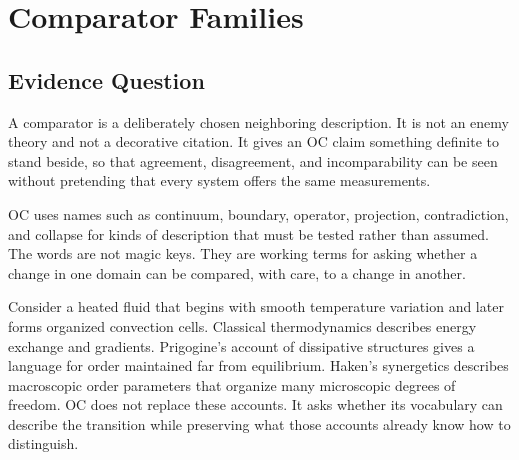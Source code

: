 \documentclass[11pt,a4paper,openany]{book}
\begin{document}
\section{Comparator Families}
\subsection{Evidence Question}
A comparator is a deliberately chosen neighboring description. It is not an enemy theory and not a decorative citation. It gives an OC claim something definite to stand beside, so that agreement, disagreement, and incomparability can be seen without pretending that every system offers the same measurements. \cite{prigogine_dissipative,haken_synergetics}\par
OC uses names such as continuum, boundary, operator, projection, contradiction, and collapse for kinds of description that must be tested rather than assumed. The words are not magic keys. They are working terms for asking whether a change in one domain can be compared, with care, to a change in another.\par
Consider a heated fluid that begins with smooth temperature variation and later forms organized convection cells. Classical thermodynamics describes energy exchange and gradients. Prigogine's account of dissipative structures gives a language for order maintained far from equilibrium. Haken's synergetics describes macroscopic order parameters that organize many microscopic degrees of freedom. OC does not replace these accounts. It asks whether its vocabulary can describe the transition while preserving what those accounts already know how to distinguish.\par
\end{document}
